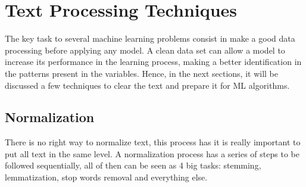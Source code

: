 \section{Text Processing Techniques}

The key task to several machine learning problems consist in make a good data processing before applying any model. A clean data set can allow a model to increase its performance in the learning process, making a better identification in the patterns present in the variables. Hence, in the next sections, it will be discussed a few techniques to clear the text and prepare it for ML algorithms.

\subsection{Normalization}

There is no right way to normalize text, this process has it is really important to put all text in the same level. A normalization process has a series of steps to be followed sequentially, all of then can be seen as 4 big tasks: stemming, lemmatization, stop words removal and everything else.

